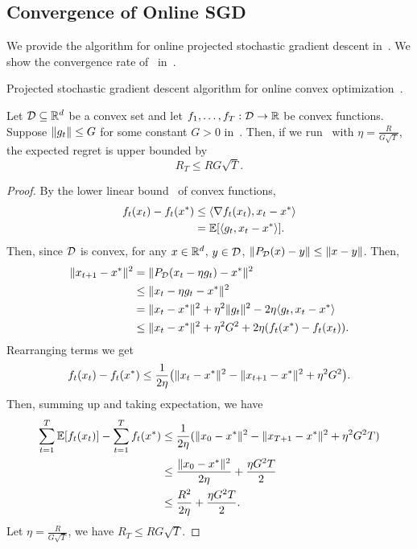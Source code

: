 \documentclass[11pt]{article}
\begin{document}
\subsection{Convergence of Online SGD}

We provide the algorithm for online projected stochastic gradient descent in~.
We show the convergence rate of~ in~.
\begin{algorithm}
    \begin{algorithmic}
        \EndFor
    \end{algorithmic}
    \caption{Projected stochastic gradient descent algorithm for online convex optimization~\citep{zinkevich2003online}.}
    \label{alg:pgd}
\end{algorithm}

\begin{theorem}\label{thm:pgd}
    Let $\mathcal{D} \subseteq \mathbb{R}^d$ be a convex set and let $f_1, \dots, f_T : \mathcal{D} \to \mathbb{R}$ be convex functions. Suppose $\lVert g_t\rVert \le G$ for some constant $G > 0$ in~. Then, if we run~ with $\eta = \frac{R}{G\sqrt{T}}$, the expected regret is upper bounded by
    \[
        R_T \le RG\sqrt{T}.
    \]
\end{theorem}
\begin{proof}
    By the lower linear bound~\citep{boyd2004convex} of convex functions,
    \begin{align*}
        f_t(x_t) - f_t(x^*)
        &\le \langle\nabla f_t(x_t), x_t - x^*\rangle\\
        &= \operatorname*{\mathbb{E}}[\langle g_t, x_t - x^*\rangle].
    \end{align*}
    Then, since $\mathcal{D}$ is convex, for any $x \in \mathbb{R}^d$, $y \in \mathcal{D}$, $\lVert P_{\mathcal{D}}(x) - y\rVert \le \lVert x - y\rVert$. Then,
    \begin{align*}
        \lVert x_{t+1} - x^*\rVert^2
        &= \lVert P_{\mathcal{D}}(x_t - \eta g_t) - x^*\rVert^2\\
        &\le \lVert x_t - \eta g_t - x^*\rVert^2\\
        &= \lVert x_t - x^*\rVert^2 + \eta^2 \lVert g_t\rVert^2 - 2\eta \langle g_t, x_t - x^*\rangle\\
        &\le \lVert x_t - x^*\rVert^2 + \eta^2 G^2 + 2\eta(f_t(x^*) - f_t(x_t)).
    \end{align*}
    Rearranging terms we get
    \[
        f_t(x_t) - f_t(x^*) \le \frac{1}{2\eta}\parens*{\norm{x_t - x^*}^2 - \norm{x_{t+1} - x^*}^2 + \eta^2 G^2}.
    \]
    Then, summing up and taking expectation, we have
    \begin{align*}
        \sum_{t=1}^T \operatorname*{\mathbb{E}}[f_t(x_t)] - \sum_{t=1}^T f_t(x^*)
        &\le \frac{1}{2\eta}(\lVert x_0 - x^*\rVert^2 - \lVert x_{T+1} - x^*\rVert^2 + \eta^2 G^2T)\\
        &\le \frac{\lVert x_0 - x^*\rVert^2}{2\eta} + \frac{\eta G^2 T}{2}\\
        &\le \frac{R^2}{2\eta} + \frac{\eta G^2 T}{2}.
    \end{align*}
    Let $\eta = \frac{R}{G\sqrt{T}}$, we have $R_T  \le RG\sqrt{T}$.
\end{proof}
\end{document}
